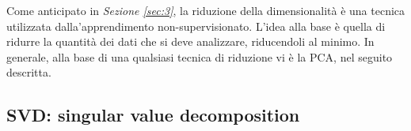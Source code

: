 \documentclass{subfiles}
\begin{document}
Come anticipato in \emph{Sezione \ref{sec:3}}, la riduzione della dimensionalità è una tecnica utilizzata dalla'apprendimento non-supervisionato.
L'idea alla base è quella di ridurre la quantità dei dati che si deve analizzare, riducendoli al minimo.
In generale, alla base di una qualsiasi tecnica di riduzione vi è la PCA, nel seguito descritta.

\subsection{SVD: singular value decomposition}

\end{document}
